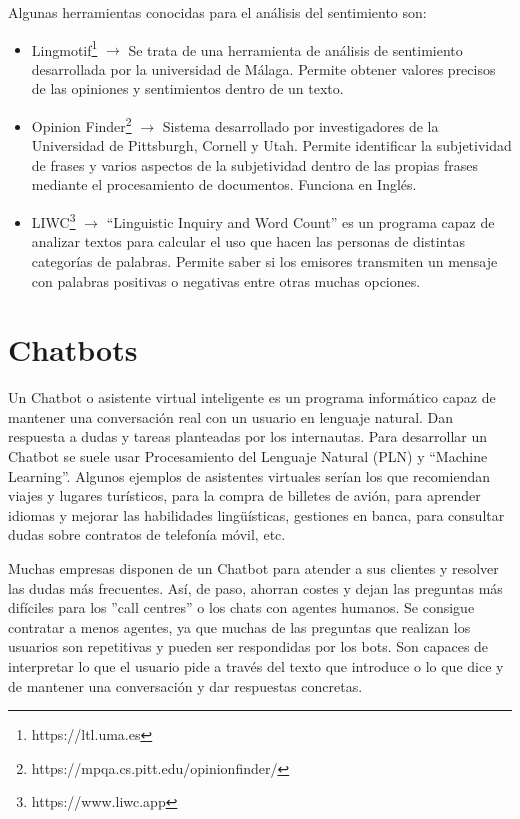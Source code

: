 Algunas herramientas conocidas para el análisis del sentimiento son:
\begin{itemize}
	\item Lingmotif\footnote{https://ltl.uma.es} $\rightarrow$ Se trata de una herramienta de análisis de sentimiento desarrollada por la universidad de Málaga. Permite obtener valores precisos de las opiniones y sentimientos dentro de un texto.
	\item Opinion Finder\footnote{https://mpqa.cs.pitt.edu/opinionfinder/} $\rightarrow$ Sistema desarrollado por investigadores de la Universidad de Pittsburgh, Cornell y Utah. Permite identificar la subjetividad de frases y varios aspectos de la subjetividad dentro de las propias frases mediante el procesamiento de documentos. Funciona en Inglés.
	\item LIWC\footnote{https://www.liwc.app} $\rightarrow$ ``Linguistic Inquiry and Word Count'' es un programa capaz de analizar textos para calcular el uso que hacen las personas de distintas categorías de palabras. Permite saber si los emisores transmiten un mensaje con palabras positivas o negativas entre otras muchas opciones.
\end{itemize}


\section{Chatbots} \label{chatbot}

Un Chatbot o asistente virtual inteligente \citep{chatbot} es un programa informático capaz de mantener una conversación real con un usuario en lenguaje natural. Dan respuesta a dudas y tareas planteadas por los internautas. Para desarrollar un Chatbot se suele usar Procesamiento del Lenguaje Natural (PLN) y ``Machine Learning''.  Algunos ejemplos de asistentes virtuales serían los que recomiendan viajes y lugares turísticos, para la compra de billetes de avión, para aprender idiomas y mejorar las habilidades lingüísticas, gestiones en banca, para consultar dudas sobre contratos de telefonía móvil, etc.

Muchas empresas disponen de un Chatbot para atender a sus clientes y resolver las dudas más frecuentes. Así, de paso, ahorran costes y dejan las preguntas más difíciles para los ''call centres'' o los chats con agentes humanos. Se consigue  contratar a menos agentes, ya que muchas de las preguntas que realizan los usuarios son repetitivas y pueden ser respondidas por los bots. Son capaces de interpretar lo que el usuario pide a través del texto que introduce o lo que dice y de mantener una conversación y dar respuestas concretas. 

